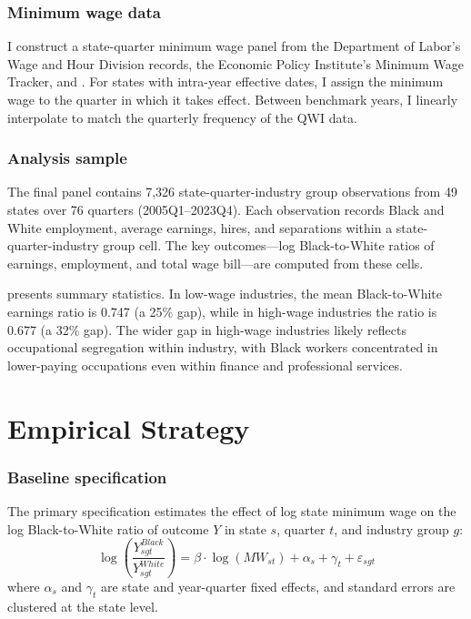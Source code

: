 \documentclass[12pt]{article}
\begin{document}
\subsubsection*{Minimum wage data} I construct a state-quarter minimum wage panel from the Department of Labor's Wage and Hour Division records, the Economic Policy Institute's Minimum Wage Tracker, and \citet{VaghulZipperer2021}. For states with intra-year effective dates, I assign the minimum wage to the quarter in which it takes effect. Between benchmark years, I linearly interpolate to match the quarterly frequency of the QWI data.

\subsubsection*{Analysis sample} The final panel contains 7,326 state-quarter-industry group observations from 49 states over 76 quarters (2005Q1--2023Q4). Each observation records Black and White employment, average earnings, hires, and separations within a state-quarter-industry group cell. The key outcomes---log Black-to-White ratios of earnings, employment, and total wage bill---are computed from these cells.

 presents summary statistics. In low-wage industries, the mean Black-to-White earnings ratio is 0.747 (a 25\% gap), while in high-wage industries the ratio is 0.677 (a 32\% gap). The wider gap in high-wage industries likely reflects occupational segregation within industry, with Black workers concentrated in lower-paying occupations even within finance and professional services.



\section{Empirical Strategy}
\label{sec:method}

\subsubsection*{Baseline specification} The primary specification estimates the effect of log state minimum wage on the log Black-to-White ratio of outcome $Y$ in state $s$, quarter $t$, and industry group $g$:
\begin{equation}
\log\left(\frac{Y^{Black}_{sgt}}{Y^{White}_{sgt}}\right) = \beta \cdot \log(MW_{st}) + \alpha_s + \gamma_t + \varepsilon_{sgt}
\label{eq:twfe}
\end{equation}
where $\alpha_s$ and $\gamma_t$ are state and year-quarter fixed effects, and standard errors are clustered at the state level.
\end{document}
